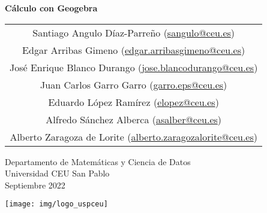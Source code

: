 \begin{titlepage}
\thispagestyle{empty}
\vspace*{7cm}
\par

\begin{center}
\normalfont\fontsize{30}{30}\selectfont
{\bfseries \color{blueceu}Cálculo con Geogebra}
\end{center}
\vspace{1cm}

\begin{center}
\Large
\begin{tabular}{c}
Santiago Angulo Díaz-Parreño (\url{sangulo@ceu.es})\\
Edgar Arribas Gimeno (\url{edgar.arribasgimeno@ceu.es})\\
José Enrique Blanco Durango (\url{jose.blancodurango@ceu.es})\\
Juan Carlos Garro Garro (\url{garro.eps@ceu.es})\\
Eduardo López Ramírez (\url{elopez@ceu.es})\\
Alfredo Sánchez Alberca (\url{asalber@ceu.es})\\
Alberto Zaragoza de Lorite (\url{alberto.zaragozalorite@ceu.es})
\end{tabular}

\medskip 
Departamento de Matemáticas y Ciencia de Datos\\ Universidad CEU San Pablo\\[1cm]
\medskip 
Septiembre 2022

\vspace{1cm}
\texttt{[image: img/logo\_uspceu]}
\end{center}
\vfill
\end{titlepage}